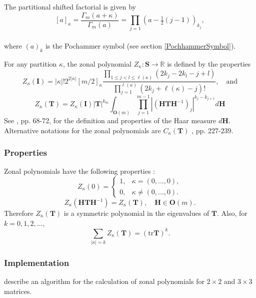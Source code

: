 The partitional shifted factorial is given by \citep{NIST}
\begin{equation}
	\left[a\right]_{\kappa} = \frac{\Gamma_m(a+\kappa)}{\Gamma_m(a)} = \prod_{j=1} \left(a-\tfrac{1}{2}(j-1) \right)_{k_j},
\end{equation} \\
where $(a)_k$ is the Pochammer symbol 
(see section \ref{PochhammerSymbol}).

For any partition $\kappa$, the zonal polynomial $Z_{\kappa} : \textbf{S} \rightarrow \mathbb{R}$ is defined by the properties \citep{NIST}
\begin{equation}
	Z_{\kappa}(\textbf{I}) = |\kappa|!2^{2|\kappa|} \left[m/2 \right]_{\kappa} \frac{\prod\limits_{1\leq j < l \leq \ell(\kappa)} (2k_j-2k_l-j+l)}{\prod\limits_{j=1}^{\ell(\kappa)} (2k_j+\ell(\kappa)-j)!}, \quad \text{and}
\end{equation} 
\begin{equation}
	Z_{\kappa}(\textbf{T}) = Z_{\kappa}(\textbf{I}) |\textbf{T}|^{k_m} \int_{\textbf{O}(m)} \prod_{j=1}^{m-1} |(\textbf{HTH}^{-1})_j|^{k_j-k_{j+1}} d\textbf{H}
\end{equation} 
See \cite{Muirhead_1982}, pp. 68-72, for the definition and properties of the Haar measure $d\textbf{H}$. Alternative notations for the zonal polynomials are $C_{\kappa}(\textbf{T})$ \cite{Muirhead_1982}, pp. 227-239.

\subsubsection{Properties}
Zonal polynomials have the following properties \citep{NIST}:
\begin{equation}
	Z_{\kappa}(0) = \begin{cases}
		1, & \kappa=(0,\ldots,0),\\
		0, & \kappa\neq(0,\ldots,0).
	\end{cases}
\end{equation} 
\begin{equation}
	Z_{\kappa}(\textbf{HTH}^{-1}) = Z_{\kappa}(\textbf{T}), \quad \textbf{H} \in \textbf{O}(m).
\end{equation} 
Therefore $Z_{\kappa}(\textbf{T})$ is a symmetric polynomial in the eigenvalues of $\textbf{T}$. Also, for $k=0,1,2,\ldots,$
\begin{equation}
	\sum_{|\kappa|=k} Z_{\kappa}(\textbf{T}) = (\text{tr}\textbf{T})^k.
\end{equation} 

\subsubsection{Implementation}
\cite{Gupta_1979} describe an algorithm for the calculation of zonal polynomials for $2\times 2$ and $3 \times 3$ matrices.


